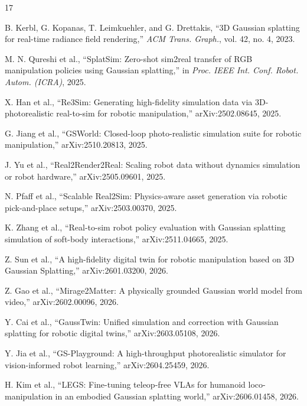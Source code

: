 \documentclass[letterpaper,10pt,conference]{ieeeconf}
\begin{document}
\begin{thebibliography}{17}

B. Kerbl, G. Kopanas, T. Leimkuehler, and G. Drettakis,
``3D Gaussian splatting for real-time radiance field rendering,''
\emph{ACM Trans. Graph.}, vol. 42, no. 4, 2023.

M. N. Qureshi et al., ``SplatSim: Zero-shot sim2real transfer of RGB
manipulation policies using Gaussian splatting,'' in \emph{Proc. IEEE Int.
Conf. Robot. Autom. (ICRA)}, 2025.

X. Han et al., ``Re3Sim: Generating high-fidelity simulation data via
3D-photorealistic real-to-sim for robotic manipulation,'' arXiv:2502.08645,
2025.

G. Jiang et al., ``GSWorld: Closed-loop photo-realistic simulation suite for
robotic manipulation,'' arXiv:2510.20813, 2025.

J. Yu et al., ``Real2Render2Real: Scaling robot data without dynamics
simulation or robot hardware,'' arXiv:2505.09601, 2025.

N. Pfaff et al., ``Scalable Real2Sim: Physics-aware asset generation via
robotic pick-and-place setups,'' arXiv:2503.00370, 2025.

K. Zhang et al., ``Real-to-sim robot policy evaluation with Gaussian splatting
simulation of soft-body interactions,'' arXiv:2511.04665, 2025.

Z. Sun et al., ``A high-fidelity digital twin for robotic manipulation based
on 3D Gaussian Splatting,'' arXiv:2601.03200, 2026.

Z. Gao et al., ``Mirage2Matter: A physically grounded Gaussian world model
from video,'' arXiv:2602.00096, 2026.

Y. Cai et al., ``GaussTwin: Unified simulation and correction with Gaussian
splatting for robotic digital twins,'' arXiv:2603.05108, 2026.

Y. Jia et al., ``GS-Playground: A high-throughput photorealistic simulator for
vision-informed robot learning,'' arXiv:2604.25459, 2026.

H. Kim et al., ``LEGS: Fine-tuning teleop-free VLAs for humanoid
loco-manipulation in an embodied Gaussian splatting world,'' arXiv:2606.01458,
2026.


\end{thebibliography}
\end{document}
